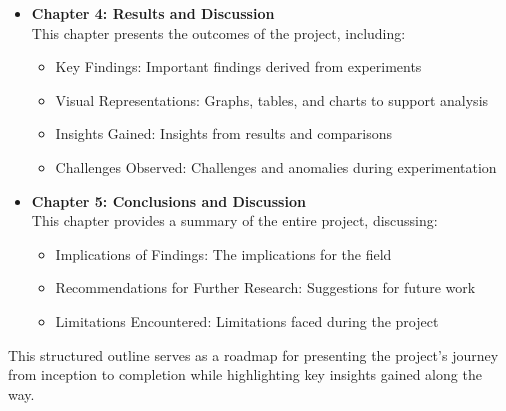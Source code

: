 \begin{itemize}
    \item \textbf{Chapter 4: Results and Discussion}\\
    This chapter presents the outcomes of the project, including:
    \begin{itemize}
        \item Key Findings: Important findings derived from experiments
        \item Visual Representations: Graphs, tables, and charts to support analysis
        \item Insights Gained: Insights from results and comparisons
        \item Challenges Observed: Challenges and anomalies during experimentation
    \end{itemize}

    \item \textbf{Chapter 5: Conclusions and Discussion}\\
    This chapter provides a summary of the entire project, discussing:
    \begin{itemize}
        \item Implications of Findings: The implications for the field
        \item Recommendations for Further Research: Suggestions for future work
        \item Limitations Encountered: Limitations faced during the project
    \end{itemize}
\end{itemize}

\begin{justify}
    
    This structured outline serves as a roadmap for presenting the project's journey from inception to completion while highlighting key insights gained along the way.
\end{justify}

